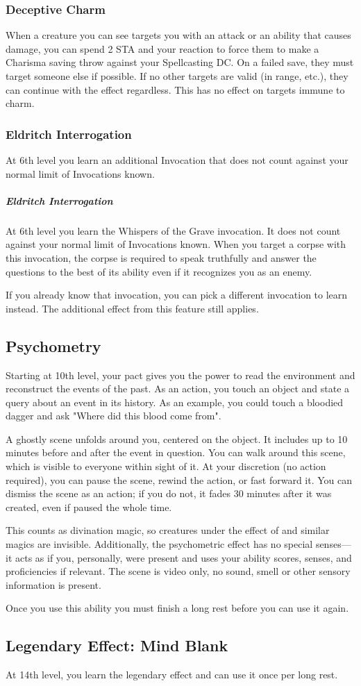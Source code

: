 \subsubsection{Deceptive Charm}
When a creature you can see targets you with an attack or an ability that causes damage, you can spend 2 STA and your reaction to force them to make a Charisma saving throw against your Spellcasting DC. On a failed save, they must target someone else if possible. If no other targets are valid (in range, etc.), they can continue with the effect regardless. This has no effect on targets immune to charm.

\subsubsection{Eldritch Interrogation}
At 6th level you learn an additional Invocation that does not count against your normal limit of Invocations known.

\subparagraph{Eldritch Interrogation}
At 6th level you learn the Whispers of the Grave invocation. It does not count against your normal limit of Invocations known. When you target a corpse with this invocation, the corpse is required to speak truthfully and answer the questions to the best of its ability even if it recognizes you as an enemy.

If you already know that invocation, you can pick a different invocation to learn instead. The additional effect from this feature still applies.

\subsection{Psychometry}
Starting at 10th level, your pact gives you the power to read the environment and reconstruct the events of the past. As an action, you touch an object and state a query about an event in its history. As an example, you could touch a bloodied dagger and ask "Where did this blood come from".

A ghostly scene unfolds around you, centered on the object. It includes up to 10 minutes before and after the event in question. You can walk around this scene, which is visible to everyone within sight of it. At your discretion (no action required), you can pause the scene, rewind the action, or fast forward it. You can dismiss the scene as an action; if you do not, it fades 30 minutes after it was created, even if paused the whole time.

This counts as divination magic, so creatures under the effect of  and similar magics are invisible. Additionally, the psychometric effect has no special senses---it acts as if you, personally, were present and uses your ability scores, senses, and proficiencies if relevant. The scene is video only, no sound, smell or other sensory information is present.

Once you use this ability you must finish a long rest before you can use it again.

\subsection{Legendary Effect: Mind Blank}
At 14th level, you learn the legendary effect  and can use it once per long rest.